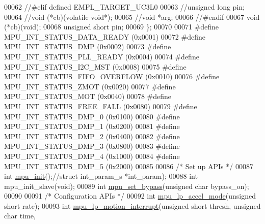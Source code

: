 \begin{DoxyCode}
00062 \textcolor{comment}{//#elif defined EMPL\_TARGET\_UC3L0}
00063     \textcolor{comment}{//unsigned long pin;}
00064     \textcolor{comment}{//void (*cb)(volatile void*);}
00065     \textcolor{comment}{//void *arg;    }
00066 \textcolor{comment}{//#endif}
00067     void (*cb)(void);
00068     \textcolor{keywordtype}{unsigned} \textcolor{keywordtype}{short} pin;
00069 \};
00070 
00071 \textcolor{preprocessor}{#define MPU\_INT\_STATUS\_DATA\_READY       (0x0001)}
00072 \textcolor{preprocessor}{#define MPU\_INT\_STATUS\_DMP              (0x0002)}
00073 \textcolor{preprocessor}{#define MPU\_INT\_STATUS\_PLL\_READY        (0x0004)}
00074 \textcolor{preprocessor}{#define MPU\_INT\_STATUS\_I2C\_MST          (0x0008)}
00075 \textcolor{preprocessor}{#define MPU\_INT\_STATUS\_FIFO\_OVERFLOW    (0x0010)}
00076 \textcolor{preprocessor}{#define MPU\_INT\_STATUS\_ZMOT             (0x0020)}
00077 \textcolor{preprocessor}{#define MPU\_INT\_STATUS\_MOT              (0x0040)}
00078 \textcolor{preprocessor}{#define MPU\_INT\_STATUS\_FREE\_FALL        (0x0080)}
00079 \textcolor{preprocessor}{#define MPU\_INT\_STATUS\_DMP\_0            (0x0100)}
00080 \textcolor{preprocessor}{#define MPU\_INT\_STATUS\_DMP\_1            (0x0200)}
00081 \textcolor{preprocessor}{#define MPU\_INT\_STATUS\_DMP\_2            (0x0400)}
00082 \textcolor{preprocessor}{#define MPU\_INT\_STATUS\_DMP\_3            (0x0800)}
00083 \textcolor{preprocessor}{#define MPU\_INT\_STATUS\_DMP\_4            (0x1000)}
00084 \textcolor{preprocessor}{#define MPU\_INT\_STATUS\_DMP\_5            (0x2000)}
00085 
00086 \textcolor{comment}{/* Set up APIs */}
00087 \textcolor{keywordtype}{int} \hyperlink{group___d_r_i_v_e_r_s_ga63637cf3771995aeda99d91d5f345f29}{mpu\_init}();\textcolor{comment}{//struct int\_param\_s *int\_param);}
00088 \textcolor{keywordtype}{int} mpu\_init\_slave(\textcolor{keywordtype}{void});
00089 \textcolor{keywordtype}{int} \hyperlink{group___d_r_i_v_e_r_s_ga36f70f38371b48d81094d3b061233e15}{mpu\_set\_bypass}(\textcolor{keywordtype}{unsigned} \textcolor{keywordtype}{char} bypass\_on);
00090 
00091 \textcolor{comment}{/* Configuration APIs */}
00092 \textcolor{keywordtype}{int} \hyperlink{group___d_r_i_v_e_r_s_gabdcf10922a1a20f1b5bbd7576d3189b9}{mpu\_lp\_accel\_mode}(\textcolor{keywordtype}{unsigned} \textcolor{keywordtype}{short} rate);
00093 \textcolor{keywordtype}{int} \hyperlink{group___d_r_i_v_e_r_s_ga7d0b3259346898ccd1ba6ef78bf7df97}{mpu\_lp\_motion\_interrupt}(\textcolor{keywordtype}{unsigned} \textcolor{keywordtype}{short} thresh, \textcolor{keywordtype}{unsigned} \textcolor{keywordtype}{char} time,

\end{DoxyCode}
